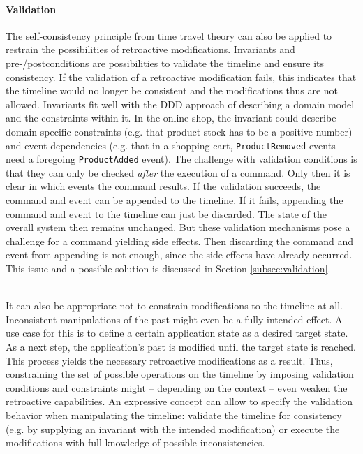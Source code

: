\paragraph{Validation}
The self-consistency principle from time travel theory can also be applied to 
restrain the possibilities of retroactive modifications.
Invariants and pre-/postconditions are possibilities to validate the timeline 
and ensure its consistency. 
If the validation of a retroactive modification fails, this indicates that the 
timeline would no longer be consistent and the modifications thus are not 
allowed. Invariants fit well with the DDD approach of describing a domain 
model and the constraints within it. 
In the online shop, the invariant could describe domain-specific constraints 
(e.g. that product stock has to be a positive number) and event dependencies
(e.g. that in a shopping cart, \texttt{ProductRemoved} events need a foregoing 
\texttt{ProductAdded} event).
%
The challenge with validation conditions is that they can only be checked
\emph{after} the execution of a command. Only then it is clear in which events 
the command results.
If the validation succeeds, the command and event can be appended to the timeline.
If it fails, appending the command and event to the timeline can just be discarded. 
The state of the overall system then remains unchanged. But these validation 
mechanisms pose a challenge for a command yielding side effects. Then discarding 
the command and event from appending is not enough, since the side effects have 
already occurred.
This issue and a possible solution is discussed in Section \ref{subsec:validation}.

\ \\
It can also be appropriate not to constrain modifications to the timeline at all. 
Inconsistent manipulations of the past might even be a fully intended effect.
%
A use case for this is to define a certain application state as a desired target 
state. As a next step, the application's past is modified until the target state 
is reached. This process yields the necessary retroactive modifications as a result.
Thus, constraining the set of possible operations on the timeline by imposing 
validation conditions and constraints might -- depending on the context -- even 
weaken the retroactive capabilities.
An expressive concept can allow to specify the validation behavior when manipulating 
the timeline: validate the timeline for consistency (e.g. by supplying an invariant 
with the intended modification) or execute the modifications with full knowledge 
of possible inconsistencies.



